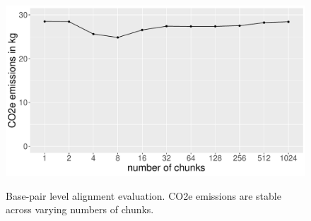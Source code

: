 \begin{figure}[htpb]
	\includegraphics[width=\textwidth]{fig/by_chunks_ALIGN_emissions.pdf}
	\label{fig:emissions}
	\caption{Base-pair level alignment evaluation. CO2e emissions are stable across varying numbers of chunks.
	}
\end{figure}